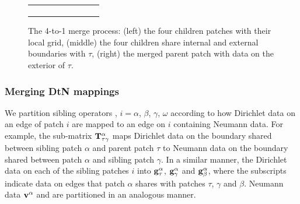 \begin{figure}
\begin{tabular}{ccc}
\begin{subfigure}[t]{0.3\textwidth}
            \label{subfig:parent_patch}
        \end{subfigure}
    \end{tabular}
    \caption{The 4-to-1 merge process: (left) the four children patches with their local grid, (middle) the four children share internal and external boundaries with $\tau$, (right) the merged parent patch with data on the exterior of $\tau$.}
    \label{fig:4_to_1_patches}
\end{figure}


\subsubsection{Merging DtN mappings} We partition sibling operators \Ti, $i=\alpha$, $\beta$, $\gamma$, $\omega$ according to how Dirichlet data on an edge of patch $i$ are mapped to an edge on $i$ containing Neumann data.  For example, the sub-matrix $\mathbf T^{\alpha}_{\tau\gamma}$ maps Dirichlet data on the boundary shared between sibling patch $\alpha$  and parent patch $\tau$ to Neumann data on the boundary shared between patch $\alpha$ and sibling patch $\gamma$. In a similar manner, the Dirichlet data on each of the sibling patches $i$ into $\mathbf g^{\alpha}_{\tau}$, $\mathbf g^{\alpha}_{\gamma}$ and $\mathbf g^{\alpha}_{\beta}$, where the subscripts indicate data on edges that patch $\alpha$ shares with patches $\tau$, $\gamma$ and $\beta$. Neumann data $\mathbf v^{\alpha}$ and \halpha are partitioned in an analogous manner. 

